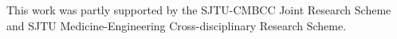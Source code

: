 \documentclass[sigconf]{acmart}
\theoremstyle{definition}
\begin{document}

\maketitle







\begin{acks}
This work was partly supported by the 
SJTU-CMBCC Joint Research Scheme and SJTU Medicine-Engineering 
Cross-disciplinary Research Scheme.
\end{acks}




\end{document}
